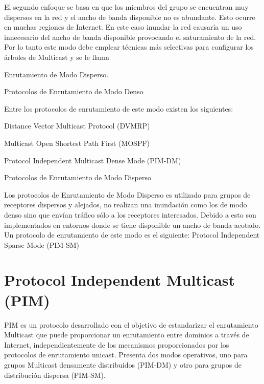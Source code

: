 \documentclass[12pt,a4paper,oneside]{book}
\begin{document}
\vspace{0.5cm}

El segundo enfoque se basa en que los miembros del grupo se encuentran muy dispersos en la red y el ancho de banda disponible no es abundante. Esto ocurre en muchas regiones de Internet. En este caso inundar la red causaría un uso innecesario del ancho de banda disponible provocando el saturamiento de la red. Por lo tanto este modo debe emplear técnicas más selectivas para configurar los árboles de Multicast y se le llama 

\vspace{0.5cm}

Enrutamiento de Modo Disperso.

\vspace{0.5cm}

Protocolos de Enrutamiento de Modo Denso

\vspace{0.5cm}	

Entre los protocolos de enrutamiento de este modo existen los siguientes:

\vspace{0.5cm}

Distance Vector Multicast Protocol (DVMRP)

\vspace{0.5cm}

Multicast Open Shortest Path First (MOSPF)

\vspace{0.5cm}

Protocol Independent Multicast Dense Mode (PIM-DM)

\vspace{0.5cm}

Protocolos de Enrutamiento de Modo Disperso

\vspace{0.5cm}

Los protocolos de Enrutamiento de Modo Disperso es utilizado para grupos de receptores dispersos y alejados, no realizan una inundación como los de modo denso sino que envían tráfico sólo a los receptores interesados. Debido a esto son implementados en entornos donde se tiene disponible un ancho de banda acotado. Un protocolo de enrutamiento de este modo es el siguiente:
Protocol Independent Sparse Mode (PIM-SM)


\section{Protocol Independent Multicast (PIM)}
\label{marco_pim}
PIM es un protocolo desarrollado con el objetivo de estandarizar el enrutamiento Multicast que puede proporcionar un enrutamiento entre dominios a través de Internet, independientemente de los mecanismos proporcionados por los protocolos de enrutamiento unicast. Presenta dos modos operativos, uno para grupos Multicast densamente distribuidos (PIM-DM) y otro para grupos de distribución dispersa (PIM-SM).
\end{document}
